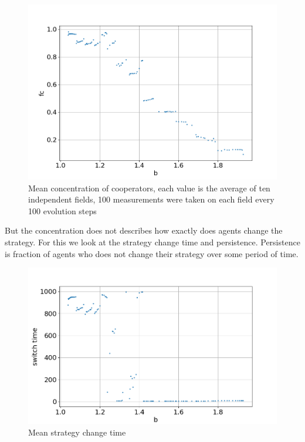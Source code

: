 \documentclass[a4paper]{jpconf}
\begin{document}
\begin{figure}[H]
	\centering
	
	\includegraphics[width = \textwidth]{C_0.9_graph.png}
	\caption{Mean concentration of cooperators, each value is the average of ten independent fields, 100 measurements were taken on each field every 100 evolution steps	}
	\label{fig:Fc}

\end{figure}



But the concentration does not describes how exactly does agents change the strategy. For this we look at the strategy change time and persistence. Persistence is fraction of agents who does not change their strategy over some period of time. 

\begin{figure}[H]
	\includegraphics[width = \textwidth]{Change_time.png}
	\caption{Mean strategy change time}
	\label{fig:change time}
\end{figure}
\end{document}
